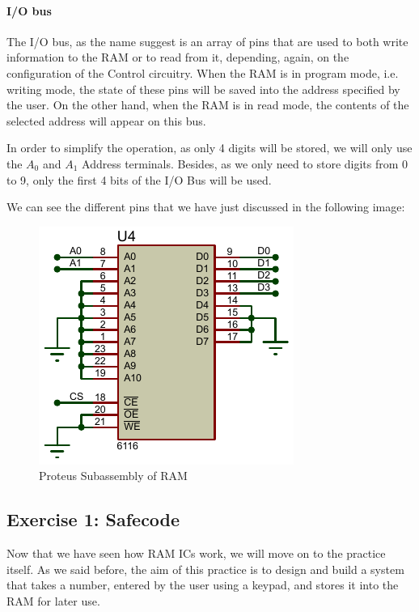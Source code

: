 \paragraph{I/O bus}

The I/O bus, as the name suggest is an array of pins that are used to both write information to the RAM or to read from it, depending, again, on the configuration of the Control circuitry. When the RAM is in program mode, i.e. writing mode, the state of these pins will be saved into the address specified by the user. On the other hand, when the RAM is in read mode, the contents of the selected address will appear on this bus.\medskip


In order to simplify the operation, as only 4 digits will be stored, we will only use the $A_0$ and $A_1$ Address terminals. Besides, as we only need to store digits from 0 to 9, only the first 4 bits of the I/O Bus will be used.\medskip

We can see the different pins that we have just discussed in the following image:\medskip

\begin{figure}[H]
    \centering
    \includegraphics[scale = 1.2]{Graphics/VHDL/Practice 6/RAM/RAM_PROTEUS.PDF}
    \caption{Proteus Subassembly of RAM}
    \label{fig:RAM_PROTEUS_Subassembly}
\end{figure}

\clearpage

\subsection{Exercise 1: Safecode}

Now that we have seen how RAM ICs work, we will move on to the practice itself. As we said before, the aim of this practice is to design and build a system that takes a number, entered by the user using a keypad, and stores it into the RAM for later use. 

